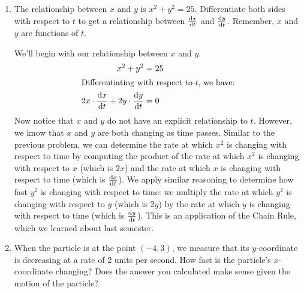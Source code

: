 \documentclass[main]{subfiles}
\begin{document}
\begin{enumerate}[resume]
\begin{enumerate}
\begin{solution}
    If we are in either quadrants II or IV, moving to the right means we are also moving upward, meaning the $y$-coordinate is increasing, or $\diff{y}{t}$ is positive.  
\end{solution}

\item 
\begin{problem}
The relationship between $x$ and $y$ is $x^2+y^2=25$. Differentiate both sides with respect to $t$ to get a relationship between $\diff{x}{t}$ and $\diff{y}{t}$. Remember, $x$ and $y$ are functions of $t$.
\end{problem}
\pspace{\vfill}

\begin{solution}
We'll begin with our relationship between $x$ and $y$.
    \begin{align*}
x^2+y^2&=25\\
\intertext{Differentiating with respect to $t$, we have:}
2x\cdot \diff{x}{t} + 2y\cdot \diff{y}{t} &= 0
\end{align*}
Now notice that $x$ and $y$ do not have an explicit relationship to $t$. However, we know that $x$ and $y$ are both changing as time passes. Similar to the previous problem, we can determine the rate at which $x^2$ is changing with respect to time by computing the product of the rate at which $x^2$ is changing with respect to $x$ (which is $2x$) and the rate at which $x$ is changing with respect to time (which is $\diff{x}{t}$).  We apply similar reasoning to determine how fast $y^2$ is changing with respect to time: we multiply the rate at which $y^2$ is changing with respect to $y$ (which is $2y$) by the rate at which $y$ is changing with respect to time (which is $\diff{y}{t}$). This is an application of the Chain Rule, which we learned about last semester.
\end{solution}
\item
\begin{problem}
When the particle is at the point $(-4, 3)$, we measure that its $y$-coordinate is decreasing at a rate of 2 units per second. How fast is the particle's $x$-coordinate changing? Does the answer you calculated make sense given the motion of the particle?
\end{problem}
\pspace{\vfill}


\end{enumerate}
\end{enumerate}
\end{document}
